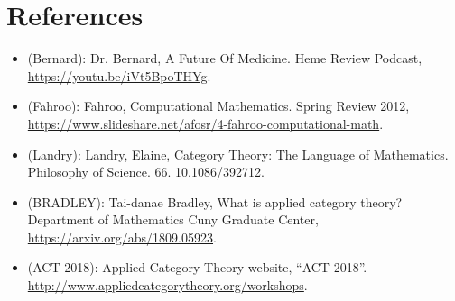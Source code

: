 \section*{References}

\begin{itemize}

\item (Bernard): Dr. Bernard, A Future Of Medicine. Heme Review Podcast, \url{https://youtu.be/iVt5BpoTHYg}.

\item (Fahroo): Fahroo, Computational Mathematics. Spring Review 2012, \url{https://www.slideshare.net/afosr/4-fahroo-computational-math}.

\item (Landry): Landry, Elaine, Category Theory: The Language of Mathematics. Philosophy of Science. 66. 10.1086/392712.


\item (BRADLEY): Tai-danae Bradley, What is applied category theory? Department of Mathematics Cuny Graduate Center, \url{https://arxiv.org/abs/1809.05923}.


\item (ACT 2018): Applied Category Theory website, “ACT 2018”. \url{http://www.appliedcategorytheory.org/workshops}.

\end{itemize}
